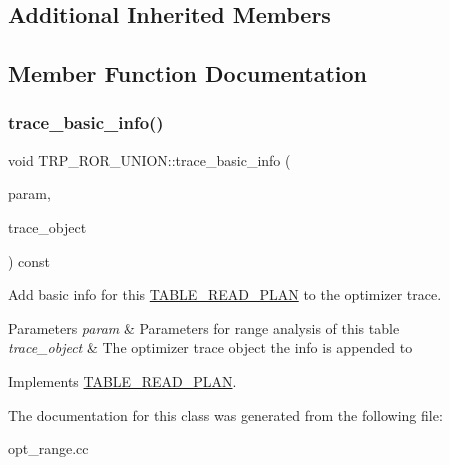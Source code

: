 \subsection*{Additional Inherited Members}


\subsection{Member Function Documentation}
\mbox{\label{classTRP__ROR__UNION_abbb6e6faf397eac6302db5d9c07c2ac9}} 
\subsubsection{\texorpdfstring{trace\+\_\+basic\+\_\+info()}{trace\_basic\_info()}}
{\footnotesize\ttfamily void T\+R\+P\+\_\+\+R\+O\+R\+\_\+\+U\+N\+I\+O\+N\+::trace\+\_\+basic\+\_\+info (\begin{DoxyParamCaption}\item[{const \mbox{\hyperlink{classPARAM}{P\+A\+R\+AM}} $\ast$}]{param,  }\item[{\mbox{\hyperlink{classOpt__trace__object}{Opt\+\_\+trace\+\_\+object}} $\ast$}]{trace\+\_\+object }\end{DoxyParamCaption}) const\hspace{0.3cm}{\ttfamily [virtual]}}

Add basic info for this \mbox{\hyperlink{classTABLE__READ__PLAN}{T\+A\+B\+L\+E\+\_\+\+R\+E\+A\+D\+\_\+\+P\+L\+AN}} to the optimizer trace.


\begin{DoxyParams}{Parameters}
{\em param} & Parameters for range analysis of this table \\
\hline
{\em trace\+\_\+object} & The optimizer trace object the info is appended to \\
\hline
\end{DoxyParams}


Implements \mbox{\hyperlink{classTABLE__READ__PLAN_a35e1758c9edce0c8bea19a602409f861}{T\+A\+B\+L\+E\+\_\+\+R\+E\+A\+D\+\_\+\+P\+L\+AN}}.



The documentation for this class was generated from the following file\+:\begin{DoxyCompactItemize}
\item 
opt\+\_\+range.\+cc\end{DoxyCompactItemize}
